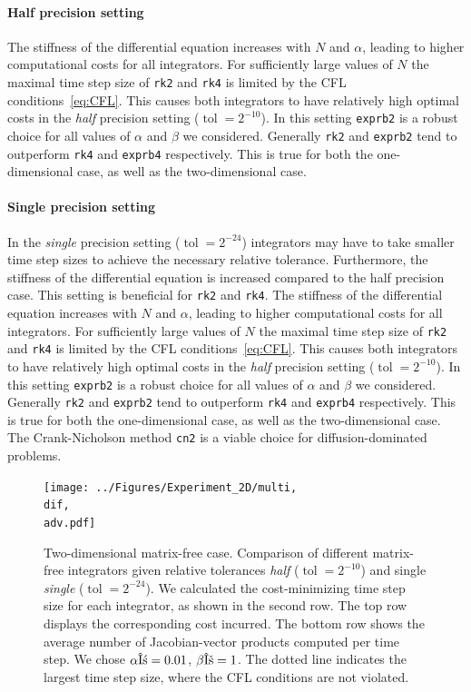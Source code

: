 \documentclass{scrartcl}
\begin{document}
	
	\paragraph{Half precision setting}
	The stiffness of the differential equation increases with $N$ and $\alpha$, leading to higher computational costs for all integrators. For sufficiently large values of $N$ the maximal time step size of \texttt{rk2} and \texttt{rk4} is limited by the CFL conditions~\ref{eq:CFL}. This causes both integrators to have relatively high optimal costs in the \textit{half} precision setting ($\operatorname{tol}=2^{-10}$). In this setting \texttt{exprb2} is a robust choice for all values of $\alpha$ and $\beta$ we considered. Generally \texttt{rk2} and \texttt{exprb2} tend to outperform \texttt{rk4} and \texttt{exprb4} respectively. This is true for both the one-dimensional case, as well as the two-dimensional case. 
	
	\paragraph{Single precision setting}
	In the \textit{single} precision setting ($\operatorname{tol}=2^{-24}$) integrators may have to take smaller time step sizes to achieve the necessary relative tolerance. Furthermore, the stiffness of the differential equation is increased compared to the half precision case. This setting is beneficial for \texttt{rk2} and \texttt{rk4}. 
	The stiffness of the differential equation increases with $N$ and $\alpha$, leading to higher computational costs for all integrators. For sufficiently large values of $N$ the maximal time step size of \texttt{rk2} and \texttt{rk4} is limited by the CFL conditions~\ref{eq:CFL}. This causes both integrators to have relatively high optimal costs in the \textit{half} precision setting ($\operatorname{tol}=2^{-10}$). In this setting \texttt{exprb2} is a robust choice for all values of $\alpha$ and $\beta$ we considered. Generally \texttt{rk2} and \texttt{exprb2} tend to outperform \texttt{rk4} and \texttt{exprb4} respectively. This is true for both the one-dimensional case, as well as the two-dimensional case. The Crank-Nicholson method \texttt{cn2} is a viable choice for diffusion-dominated problems.
	
	
	\begin{figure}[t]
	\newcommand{\dif}{\detokenize{α}=0.01}
	\newcommand{\adv}{\detokenize{β}=1}
	\centering
	\texttt{[image: ../Figures/Experiment\_2D/multi, \\dif, \\adv.pdf]}
	\caption{Two-dimensional matrix-free case. Comparison of different matrix-free integrators given relative tolerances \textit{half} ($\operatorname{tol} = 2^{-10}$) and single \textit{single} ($\operatorname{tol} = 2^{-24}$). We calculated the cost-minimizing time step size for each integrator, as shown in the second row. The top row displays the corresponding cost incurred. The bottom row shows the average number of Jacobian-vector products computed per time step. We chose $\alpha\dif$, $\beta\adv$. The dotted line indicates the largest time step size, where the CFL conditions are not violated.}
	\label{fig:multi2DNonlinear}
	\end{figure}
	
\end{document}

